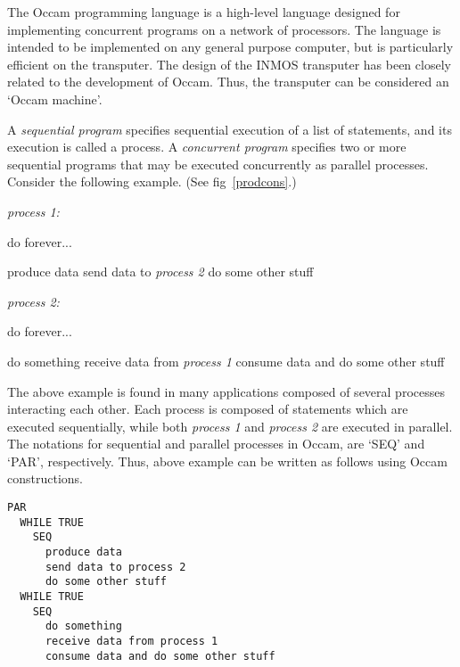The Occam programming language is a high-level language designed for
implementing concurrent programs on a network of processors.
The language is intended to be implemented on any general purpose
computer, but is particularly efficient on the transputer.  The design
of the INMOS transputer has been closely related to the development of
Occam. Thus, the transputer can be considered an `Occam machine'.
\cite{InmosTds87}


\par
A {\em sequential program} specifies sequential execution of a list of
statements, and its execution is called a process.  A {\em concurrent
program} specifies two or more sequential programs that may be
executed concurrently as parallel processes.  Consider the following
example. (See fig~\ref{prodcons}.)
\begin{lin}
	{\em process 1:}
	\begin{algo}
	\step[] do forever...
		\begin{subalgo}
		\step[] produce data
		\step[] send data to {\em process 2}
		\step[] do some other stuff
		\end{subalgo}
	\end{algo}
	{\em process 2:}
	\begin{algo}
	\step[] do forever...
		\begin{subalgo}
		\step[] do something
		\step[] receive data from {\em process 1}
		\step[] consume data and do some other stuff
		\end{subalgo}
	\end{algo}
\end{lin}

\par
The above example is found in many applications composed of
several processes interacting each other.  Each process is composed of
statements which are executed sequentially, while both {\em process 1}
and {\em process 2} are executed in parallel.  The notations for
sequential and parallel processes in Occam, are `SEQ' and `PAR',
respectively.  Thus, above example can be written as follows using
Occam constructions.
\begin{lin}
\begin{verbatim}
PAR
  WHILE TRUE
    SEQ
      produce data
      send data to process 2
      do some other stuff
  WHILE TRUE
    SEQ 
      do something
      receive data from process 1
      consume data and do some other stuff
\end{verbatim}
\end{lin}

